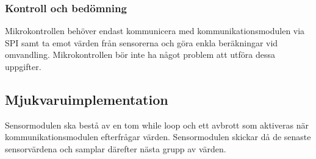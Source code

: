 \documentclass[designspec/spec.tex]{subfiles}
\begin{document}
\subsubsection{Kontroll och bedömning}

Mikrokontrollen behöver endast kommunicera med kommunikationsmodulen via SPI
samt ta emot värden från sensorerna och göra enkla beräkningar vid omvandling.
Mikrokontrollen bör inte ha något problem att utföra dessa uppgifter.

\subsection{Mjukvaruimplementation} 
Sensormodulen ska bestå av en tom while loop och ett avbrott som aktiveras när
kommunikationsmodulen efterfrågar värden. Sensormodulen skickar då de senaste
sensorvärdena och samplar därefter nästa grupp av värden.
\end{document}
